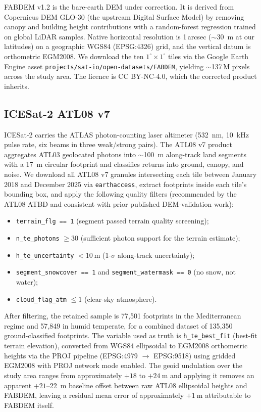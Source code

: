 \documentclass[preprint,authoryear,number]{elsarticle}
\begin{document}
FABDEM v1.2 \citep{Hawker2022FABDEM} is the bare-earth DEM under correction. It is derived from Copernicus DEM GLO-30 (the upstream Digital Surface Model) by removing canopy and building height contributions with a random-forest regression trained on global LiDAR samples. Native horizontal resolution is 1\,arcsec ($\sim$\SI{30}{\meter} at our latitudes) on a geographic WGS84 (EPSG:4326) grid, and the vertical datum is orthometric EGM2008. We download the ten $1^{\circ} \times 1^{\circ}$ tiles via the Google Earth Engine asset \texttt{projects/sat-io/open-datasets/FABDEM}, yielding $\sim$137\,M pixels across the study area. The licence is CC BY-NC-4.0, which the corrected product inherits.

\subsection{ICESat-2 ATL08 v7}
\label{sec:atl08}

ICESat-2 \citep{Markus2017ICESat2} carries the ATLAS photon-counting laser altimeter (\SI{532}{\nano\meter}, \SI{10}{\kilo\hertz} pulse rate, six beams in three weak/strong pairs). The ATL08 v7 product \citep{Neuenschwander2019ATL08} aggregates ATL03 geolocated photons into $\sim$\SI{100}{\meter} along-track land segments with a \SI{17}{\meter} circular footprint and classifies returns into ground, canopy, and noise. We download all ATL08 v7 granules intersecting each tile between January 2018 and December 2025 via \texttt{earthaccess}, extract footprints inside each tile's bounding box, and apply the following quality filters (recommended by the ATL08 ATBD and consistent with prior published DEM-validation work):

\begin{itemize}
\item \texttt{terrain\_flg == 1} (segment passed terrain quality screening);
\item \texttt{n\_te\_photons} $\geq 30$ (sufficient photon support for the terrain estimate);
\item \texttt{h\_te\_uncertainty} $< \SI{10}{\meter}$ (1-$\sigma$ along-track uncertainty);
\item \texttt{segment\_snowcover == 1} and \texttt{segment\_watermask == 0} (no snow, not water);
\item \texttt{cloud\_flag\_atm} $\leq 1$ (clear-sky atmosphere).
\end{itemize}

After filtering, the retained sample is 77{,}501 footprints in the Mediterranean regime and 57{,}849 in humid temperate, for a combined dataset of 135{,}350 ground-classified footprints. The variable used as truth is \texttt{h\_te\_best\_fit} (best-fit terrain elevation), converted from WGS84 ellipsoidal to EGM2008 orthometric heights via the PROJ pipeline (EPSG:4979 $\to$ EPSG:9518) using gridded EGM2008 \citep{Pavlis2012EGM2008} with PROJ network mode enabled. The geoid undulation over the study area ranges from approximately $+18$ to $+\SI{24}{\meter}$ and applying it removes an apparent $+21$--\SI{22}{\meter} baseline offset between raw ATL08 ellipsoidal heights and FABDEM, leaving a residual mean error of approximately $+\SI{1}{\meter}$ attributable to FABDEM itself.
\end{document}
